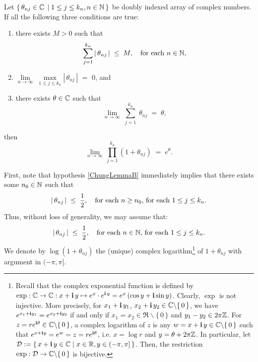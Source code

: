 \begin{lemma}
\label{ChungSevenOne}
\mbox{}\vskip 0.2cm
\noindent
Let $\{\,\theta_{nj} \in \mathbb{C}\,\;\vert\;1 \leq j \leq k_{n}, n \in \mathbb{N} \,\}$ be doubly indexed array of complex numbers.
If all the following three conditions are true:
\begin{enumerate}
\item	\label{ChungLemmaA}
		there exists $M > 0$ such that
		\begin{equation*}
		\overset{k_{n}}{\underset{j =1}{\sum}}\left\vert\, \theta_{nj} \,\right\vert \;\leq\; M,
		\quad
		\textnormal{for each $n \in \mathbb{N}$},
		\end{equation*}
\item	\label{ChungLemmaB}
		$\underset{n\rightarrow\infty}{\lim} \; \underset{1 \leq j \leq k_{n}}{\max}\left\vert\, \theta_{nj} \,\right\vert$ \;$=$\; $0$, and
\item	\label{ChungLemmaC}
		there exists $\theta \in \mathbb{C}$ such that
		\begin{equation*}
		\lim_{n\rightarrow\infty}\;\overset{k_{n}}{\underset{j =1}{\sum}} \; \theta_{nj} \; = \; \theta,
		\end{equation*}
\end{enumerate}
then
\begin{equation*}
\lim_{n\rightarrow\infty}\,\prod_{j=1}^{k_{n}}\left( 1 + \theta_{nj} \right) \; = \; e^{\theta}.
\end{equation*}
\end{lemma}
\proof
First, note that hypothesis \eqref{ChungLemmaB} immediately implies that there exists some $n_{0} \in \mathbb{N}$ such that
\begin{equation*}
\vert\,\theta_{nj}\,\vert \;\leq\; \dfrac{1}{2},
\quad
\textnormal{for each $n \geq n_{0}$, for each $1 \leq j \leq k_{n}$}.
\end{equation*}
Thus, without loss of generality, we may assume that:
\begin{equation*}
\vert\,\theta_{nj}\,\vert \;\leq\; \dfrac{1}{2},
\quad
\textnormal{for each $n\in\mathbb{N}$, for each $1 \leq j \leq k_{n}$}.
\end{equation*}
We denote by $\log(1+\theta_{nj})$ the (unique) complex logarithm\footnote{Recall that the complex exponential function is defined by
$\exp : \mathbb{C} \rightarrow \mathbb{C} : x + \textnormal{\bf i}\,y \mapsto e^{x}\cdot e^{\textnormal{\bf i}\,y} = e^{x}\left(\cos y + \textnormal{\bf i}\sin y\right)$.
Clearly, $\exp$ is not injective.
More precisely, for $x_{1} + \textnormal{\bf i}\,y_{1}$, $x_{2} + \textnormal{\bf i}\,y_{2} \in \mathbb{C}\backslash\{\,0\,\}$,
we have $e^{x_{1}+\textnormal{\bf i} y_{1}} = e^{x_{2}+\textnormal{\bf i} y_{2}}$ if and only if $x_{1} = x_{2} \in \Re\backslash\{\,0\,\}$ and $y_{1} - y_{2} \in 2\pi\mathbb{Z}$.
For $z = re^{\textnormal{\bf i}\theta} \in \mathbb{C}\backslash\{\,0\,\}$, a complex logarithm
of $z$ is any $w = x + \textnormal{\bf i}\,y \in \mathbb{C}\backslash\{\,0\,\}$ such that $e^{x+\textnormal{\bf i} y} = e^{w} = z = re^{\textnormal{\bf i}\theta}$, i.e.
$x = \log r$ and $y = \theta + 2\pi\mathbb{Z}$. In particular, let $\mathcal{D} := \left\{\,x  +\textnormal{\bf i}\, y \in \mathbb{C} \;\vert\; x \in \mathbb{R}, y \in(-\pi,\pi]\,\right\}$.
Then, the restriction $\exp : \mathcal{D} \rightarrow \mathbb{C}\backslash\{\,0\,\}$ is bijective.} of $1 + \theta_{nj}$ with argument in $(-\pi,\pi]$.
